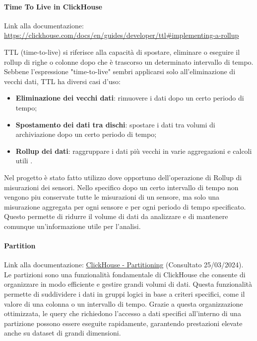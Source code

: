 \paragraph{Time To Live in ClickHouse} \label{sec:RollupTTL}
Link alla documentazione: \href{https://clickhouse.com/docs/en/guides/developer/ttl#implementing-a-rollup}{https://clickhouse.com/docs/en/guides/developer/ttl\#implementing-a-rollup} \newline

TTL (time-to-live) si riferisce alla capacità di spostare, eliminare o eseguire il rollup di righe o colonne dopo che è trascorso un determinato intervallo di tempo. Sebbene l'espressione "time-to-live" sembri applicarsi solo all'eliminazione di vecchi dati, TTL ha diversi casi d'uso:
\begin{itemize}
  \item \textbf{Eliminazione dei vecchi dati}: rimuovere i dati dopo un certo periodo di tempo;
  \item \textbf{Spostamento dei dati tra dischi}: spostare i dati tra volumi di archiviazione dopo un certo periodo di tempo;
  \item \textbf{Rollup dei dati}: raggruppare i dati più vecchi in varie aggregazioni e calcoli utili .
\end{itemize}

Nel progetto è stato fatto utilizzo dove opportuno dell'operazione di Rollup di misurazioni dei sensori.
Nello specifico dopo un certo intervallo di tempo non vengono piu conservate tutte le misurazioni di un sensore, ma solo una misurazione aggregata per ogni sensore e per ogni periodo di tempo specificato. Questo permette di ridurre il volume di dati da analizzare e di mantenere comunque un'informazione utile per l'analisi.

\paragraph{Partition}\label{sec:Partition}
Link alla documentazione: \href{https://clickhouse.com/docs/en/engines/table-engines/mergetree-family/mergetree#partition-by}{ClickHouse - Partitioning} (Consultato 25/03/2024).\\
Le partizioni sono una funzionalità fondamentale di ClickHouse che consente di organizzare in modo efficiente e gestire grandi volumi di dati. Questa funzionalità permette di suddividere i dati in gruppi logici in base a criteri specifici, come il valore di una colonna o un intervallo di tempo. Grazie a questa organizzazione ottimizzata, le query che richiedono l'accesso a dati specifici all'interno di una partizione possono essere eseguite rapidamente, garantendo prestazioni elevate anche su dataset di grandi dimensioni.\\

